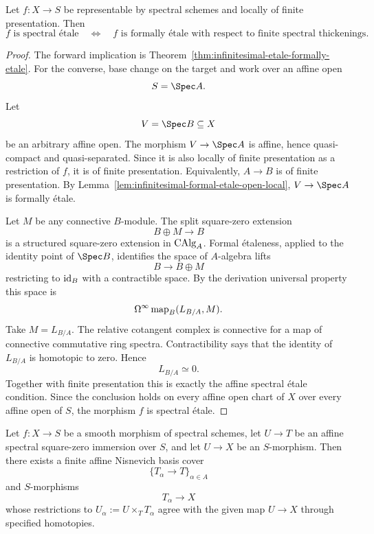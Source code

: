 \begin{theorem}
\label{thm:infinitesimal-etale-recognition}
Let $f:X\to S$ be representable by spectral schemes and locally of finite
presentation.  Then
\[
    \boxed{
    f\text{ is spectral \'etale}
    \quad\Longleftrightarrow\quad
    f\text{ is formally \'etale with respect to finite spectral thickenings}.
    }
\]
\end{theorem}

\begin{proof}
The forward implication is
Theorem~\ref{thm:infinitesimal-etale-formally-etale}.  For the converse,
base change on the target and work over an affine open
\[
    S=\Spec A.
\]
Let
\[
    V=\Spec B\subseteq X
\]
be an arbitrary affine open.  The morphism $V\to\Spec A$ is affine, hence
quasi-compact and quasi-separated.  Since it is also locally of finite
presentation as a restriction of $f$, it is of finite presentation.
Equivalently, $A\to B$ is of finite presentation.  By
Lemma~\ref{lem:infinitesimal-formal-etale-open-local}, $V\to\Spec A$ is
formally \'etale.

Let $M$ be any connective $B$-module.  The split square-zero extension
\[
    B\oplus M\longrightarrow B
\]
is a structured square-zero extension in $\operatorname{CAlg}_A$.  Formal \'etaleness,
applied to the identity point of $\Spec B$, identifies the space of
$A$-algebra lifts
\[
    B\longrightarrow B\oplus M
\]
restricting to $\operatorname{id}_B$ with a contractible space.  By the derivation universal
property this space is
\[
    \Omega^\infty\operatorname{map}_B(L_{B/A},M).
\]
Take $M=L_{B/A}$.  The relative cotangent complex is connective for a map of
connective commutative ring spectra.  Contractibility says that the identity
of $L_{B/A}$ is homotopic to zero.  Hence
\[
    L_{B/A}\simeq0.
\]
Together with finite presentation this is exactly the affine spectral
\'etale condition.  Since the conclusion holds on every affine open chart of
$X$ over every affine open of $S$, the morphism $f$ is spectral \'etale.
\end{proof}

\begin{lemma}
\label{lem:infinitesimal-smooth-one-stage-lifting}
Let $f:X\to S$ be a smooth morphism of spectral schemes, let
$U\to T$ be an affine spectral square-zero immersion over $S$, and let
$U\to X$ be an $S$-morphism.  Then there exists a finite affine Nisnevich
basis cover
\[
    \{T_\alpha\to T\}_{\alpha\in A}
\]
and $S$-morphisms
\[
    T_\alpha\longrightarrow X
\]
whose restrictions to $U_\alpha:=U\times_TT_\alpha$ agree with the given
map $U\to X$ through specified homotopies.
\end{lemma}

